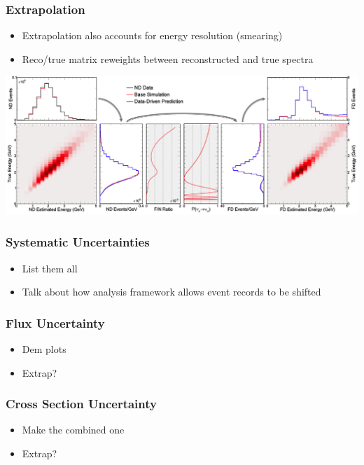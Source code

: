 \documentclass[10pt,professionalfonts,xcolor=table]{beamer}
\begin{document}
\begin{frame}
\frametitle{Extrapolation}

  \begin{itemize}
  \item Extrapolation also accounts for energy resolution (smearing)
  \item Reco/true matrix reweights between reconstructed and true spectra

  \end{itemize}
  \gap
  \begin{center}
   \includegraphics[width=\textwidth]{figures/figures/extrap_schematic.png}
  \end{center}
\end{frame}


\begin{frame}
\frametitle{Systematic Uncertainties}
\begin{itemize}
\item List them all
\item Talk about how analysis framework allows event records to be shifted
\end{itemize}
\end{frame}


\begin{frame}
\frametitle{Flux Uncertainty}
\begin{itemize}
\item Dem plots
\item Extrap?
\end{itemize}
\end{frame}

\begin{frame}
\frametitle{Cross Section Uncertainty}
\begin{itemize}
\item Make the combined one
\item Extrap?
\end{itemize}
\end{frame}
\end{document}
